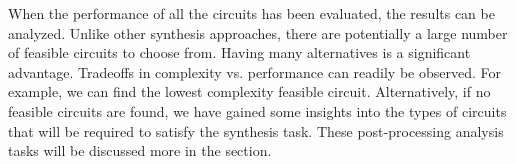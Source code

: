 When the performance of all the circuits has been evaluated, the results can be analyzed.
Unlike other synthesis approaches, there are potentially a large number of feasible circuits to choose from.
Having many alternatives is a significant advantage.
Tradeoffs in complexity vs. performance can readily be observed. For example, we can find the lowest complexity feasible circuit.
Alternatively, if no feasible circuits are found, we have gained some insights into the types of circuits that will be required to satisfy the synthesis task.
These post-processing analysis tasks will be discussed more in the  section.